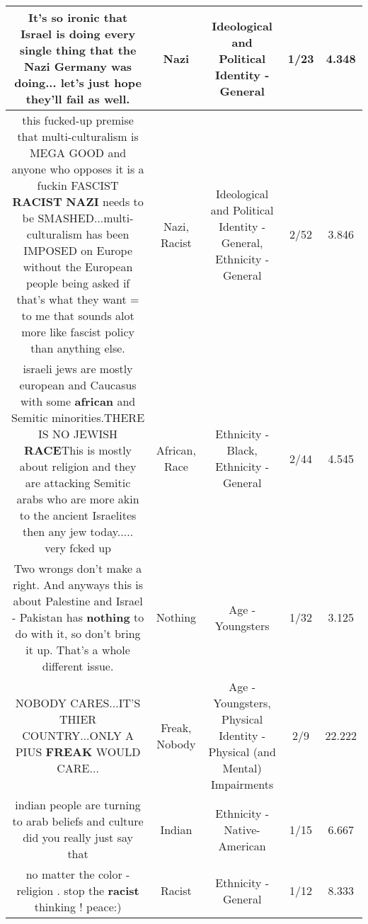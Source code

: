 \documentclass[11pt]{article}
\newlength\mylength
\begin{document}
\begin{center}
\begin{longtable}{|C{.65\mylength}|C{.30\mylength}|C{.12\mylength}|C{.12\mylength}|C{.12\mylength}|}
  \small It's so  ironic that Israel is doing every single thing that the \textbf{Nazi} Germany was doing... let's just hope they'll fail as well.\normalsize   & Nazi &  Ideological and Political Identity - General & 1/23 & 4.348 \\  \hline
  \small this fucked-up premise that multi-culturalism is MEGA GOOD and anyone who opposes it is a fuckin FASCIST \textbf{RACIST} \textbf{NAZI} needs to be SMASHED...multi-culturalism has been IMPOSED on Europe without the European people being asked if that's what they want = to me that sounds alot more like fascist policy than anything else.\normalsize   & Nazi, Racist &  Ideological and Political Identity - General, Ethnicity - General & 2/52 & 3.846 \\  \hline
  \small israeli jews are mostly european and Caucasus with some \textbf{african} and Semitic minorities.THERE IS NO JEWISH \textbf{RACE}This is mostly about religion and they are attacking Semitic arabs who are more akin to the ancient Israelites then any jew today..... very fcked up\normalsize   & African, Race & Ethnicity - Black, Ethnicity - General & 2/44 & 4.545 \\  \hline
  \small Two wrongs don't make a right. And anyways this is about Palestine and Israel - Pakistan has \textbf{nothing} to do with it, so don't bring it up. That's a whole different issue.\normalsize   & Nothing & Age - Youngsters & 1/32 & 3.125 \\  \hline
  \small NOBODY CARES...IT'S THIER COUNTRY...ONLY A PIUS \textbf{FREAK} WOULD CARE...\normalsize   & Freak, Nobody & Age - Youngsters, Physical Identity - Physical (and Mental) Impairments & 2/9 & 22.222 \\  \hline
  \small indian people are turning to arab beliefs and culture did you really just say that\normalsize   & Indian & Ethnicity - Native-American & 1/15 & 6.667 \\  \hline
  \small no matter the color -religion . stop the \textbf{racist} thinking ! peace:)\normalsize   & Racist & Ethnicity - General & 1/12 & 8.333 \\  \hline

\end{longtable}
\end{center}
\end{document}
